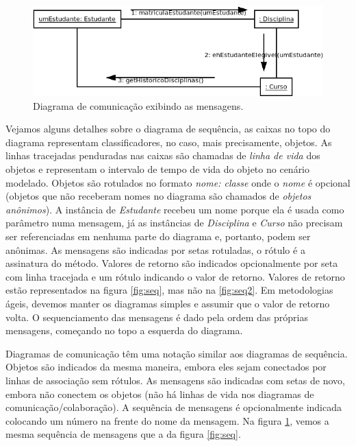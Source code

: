 \documentclass[
	11pt,				%
	openright,
	twoside,			%
	a4paper,			%
	english,			%
	french,
	brazil,				%
	sumario=tradicional
	]{abntex2}
\begin{document}
\begin{figure}[h]
\begin{center}
\includegraphics[scale=0.6]{clsComm.png}
\end{center}
\caption{Diagrama de comunicação exibindo as mensagens.} \label{fig:comm}
\end{figure}

Vejamos alguns detalhes sobre o diagrama de sequência, as caixas no topo do diagrama representam classificadores, no caso, mais precisamente, objetos. As linhas tracejadas penduradas nas caixas são chamadas de \textit{linha de vida} dos objetos e representam o intervalo de tempo de vida do objeto no cenário modelado. Objetos são rotulados no formato \emph{nome: classe} onde o \emph{nome} é opcional (objetos que não receberam nomes no diagrama são chamados de \textit{objetos anônimos}). A instância de \emph{Estudante} recebeu um nome porque ela é usada como parâmetro numa mensagem, já as instâncias de \emph{Disciplina} e \emph{Curso} não precisam ser referenciadas em nenhuma parte do diagrama e, portanto, podem ser anônimas. As  mensagens são indicadas por setas rotuladas, o rótulo é a assinatura do método. Valores de retorno são indicados opcionalmente por seta com linha tracejada e um rótulo indicando o valor de retorno. Valores de retorno estão representados na figura \ref{fig:seq}, mas não na \ref{fig:seq2}. Em metodologias ágeis, devemos manter os diagramas simples e assumir que o valor de retorno volta. O sequenciamento das mensagens é dado pela ordem das próprias mensagens, começando no topo a esquerda do diagrama.

Diagramas de comunicação têm uma notação similar aos diagramas de sequência. Objetos são indicados da mesma maneira, embora eles sejam conectados por linhas de associação sem rótulos. As mensagens são indicadas com setas de novo, embora não conectem os objetos (não há linhas de vida nos diagramas de comunicação/colaboração). A sequência de mensagens é opcionalmente indicada colocando um número na frente do nome da mensagem. Na figura \ref{fig:comm}, vemos a mesma sequência de mensagens que a da figura \ref{fig:seq}.
\end{document}
